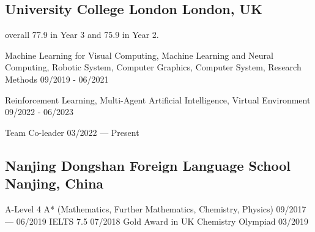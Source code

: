 
\subsection{University College London \hfill London, UK}

    \begin{zitemize}
        \item   overall 77.9 in Year 3 and 75.9 in Year 2.  
        \item   Machine Learning for Visual Computing, 
                Machine Learning and Neural Computing, 
                Robotic System, 
                Computer Graphics, 
                Computer System,
                Research Methods 
                \hfill 09/2019 - 06/2021
        \item   Reinforcement Learning,    
                Multi-Agent Artificial Intelligence,
                Virtual Environment 
                \hfill 09/2022 - 06/2023
    \end{zitemize}

    \begin{zitemize}
        \item   Team Co-leader 
                \hfill 03/2022 --- Present
    \end{zitemize}


\vspace{0.3em}


\subsection{Nanjing Dongshan Foreign Language School \hfill Nanjing, China}
    A-Level 4 A* (Mathematics, Further Mathematics, Chemistry, Physics) 
        \hfill 09/2017 --- 06/2019 
    \newline
    IELTS 7.5 
        \hfill 07/2018 
    \newline
    Gold Award in UK Chemistry Olympiad
        \hfill 03/2019


